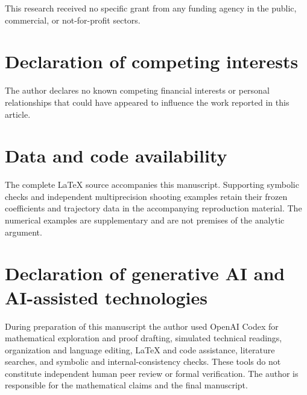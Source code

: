 \documentclass[a4paper,11pt]{article}
\numberwithin{equation}{section}
\theoremstyle{definition}
\theoremstyle{remark}
\begin{document}
This research received no specific grant from any funding agency in the
public, commercial, or not-for-profit sectors.

\section*{Declaration of competing interests}
The author declares no known competing financial interests or personal
relationships that could have appeared to influence the work reported in this
article.

\section*{Data and code availability}
The complete LaTeX source accompanies this manuscript. Supporting
symbolic checks and independent multiprecision shooting examples retain
their frozen coefficients and trajectory data in the accompanying
reproduction material. The numerical examples are supplementary and are
not premises of the analytic argument.

\section*{Declaration of generative AI and AI-assisted technologies}
During preparation of this manuscript the author used OpenAI Codex for
mathematical exploration and proof drafting, simulated technical readings,
organization and language editing, LaTeX and code assistance, literature
searches, and symbolic and internal-consistency checks. These tools do not
constitute independent human peer review or formal verification. The author
is responsible for the mathematical claims and the final manuscript.

\begingroup
\sloppy


\endgroup
\end{document}
